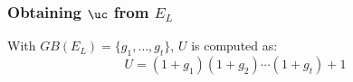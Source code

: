 

\subsubsection{Obtaining $\uc$ from $E_L$}


With $GB(E_L) = \{g_1,\dots,g_t\}$, $U$ is computed as:
\begin{equation}
\label{eqn:id2poly}
U = (1+g_1)(1+g_2)\cdots(1+g_t)+1
\end{equation}

